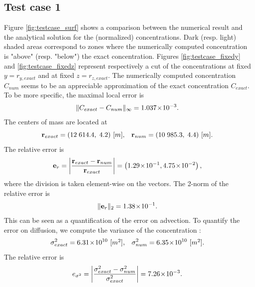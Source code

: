 \subsection*{Test case 1}
Figure \ref{fig:testcase_surf} shows a comparison between the numerical result and the analytical solution for the (normalized) concentrations. Dark (resp. light) shaded areas correspond to zones where the numerically computed concentration is "above" (resp. "below") the exact concentration. Figures \ref{fig:testcase_fixedy} and \ref{fig:testcase_fixedz} represent respectively a cut of the concentrations at fixed $y = r_{y,exact}$ and at fixed $z = r_{z,exact}$. The numerically computed concentration $C_{num}$ seems to be an appreciable approximation of the exact concentration $C_{exact}$. To be more specific, the maximal local error is 
\begin{equation}
	\|C_{exact}-C_{num}\|_{\infty} = 1.037\!\times\!10^{-3}.
\end{equation}
The centers of mass are located at
\begin{equation}
	\mathbf r_{exact} = (12\;614.4,\;4.2) \mbox{ [$m$],}\quad \mathbf r_{num} = (10\;985.3,\;4.4) \mbox{ [$m$]}.
\end{equation}
The relative error is
\begin{equation}
	\mathbf e_r = \left \lvert \frac{\mathbf r_{exact}-\mathbf r_{num}}{\mathbf r_{exact}} \right \rvert =  \left(1.29\!\times\!10^{-1}, 4.75\!\times\!10^{-2}\right),
\end{equation}
where the division is taken element-wise on the vectors. The 2-norm of the relative error is
\begin{equation}
	\| \mathbf e_r \|_2 = 1.38\!\times\!10^{-1}.
\end{equation}
This can be seen as a quantification of the error on advection. To quantify the error on diffusion, we compute the variance of the concentration :
\begin{equation}
	\sigma^2_{exact} = 6.31\!\times\!10^{10} \mbox{ [$m^2$],}\quad \sigma^2_{num} = 6.35\!\times\!10^{10} \mbox{ [$m^2$].}
\end{equation}
The relative error is
\begin{equation}
	e_{\sigma^2} = \left \lvert \frac{\sigma^2_{exact}-\sigma^2_{num}}{\sigma^2_{exact}}\right \rvert = 7.26\!\times\!10^{-3}.
\end{equation}
